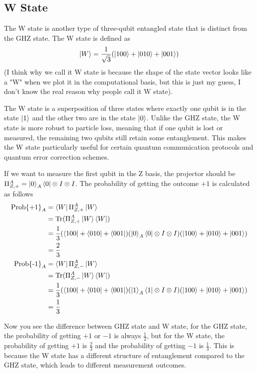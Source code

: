 \documentclass[11pt, letterpaper]{article}
\begin{document}
\subsection{W State}
The W state is another type of three-qubit entangled state that is distinct from the GHZ state. The W state is defined as
\begin{equation}
  \ket{W} = \frac{1}{\sqrt{3}}(\ket{100} + \ket{010} + \ket{001})
\end{equation}
(I think why we call it W state is because the shape of the state vector looks like a "W" when we plot it in the computational basis, but this is just my guess, I don't know the real reason why people call it W state).

The W state is a superposition of three states where exactly one qubit is in the state $\ket{1}$ and the other two are in the state $\ket{0}$. Unlike the GHZ state, the W state is more robust to particle loss, meaning that if one qubit is lost or measured, the remaining two qubits still retain some entanglement. This makes the W state particularly useful for certain quantum communication protocols and quantum error correction schemes.

If we want to measure the first qubit in the Z basis, the projector should be $\Pi_{Z, +}^{A} = \ket{0}_A\bra{0} \otimes I \otimes I$. The probability of getting the outcome $+1$ is calculated as follows
\begin{equation}
  \begin{aligned}
    \text{Prob\{+1\}}_A & = \bra{W} \Pi_{Z, +}^{A} \ket{W} \\
    & = \text{Tr}(\Pi_{Z, +}^{A} \ket{W}\bra{W}) \\
    & = \frac{1}{3}(\bra{100} + \bra{010} + \bra{001})(\ket{0}_A\bra{0} \otimes I \otimes I)(\ket{100} + \ket{010} + \ket{001}) \\
    & = \frac{2}{3} \\
    \text{Prob\{-1\}}_A & = \bra{W} \Pi_{Z, -}^{A} \ket{W} \\
    & = \text{Tr}(\Pi_{Z, -}^{A} \ket{W}\bra{W}) \\
    & = \frac{1}{3}(\bra{100} + \bra{010} + \bra{001})(\ket{1}_A\bra{1} \otimes I \otimes I)(\ket{100} + \ket{010} + \ket{001}) \\
    & = \frac{1}{3}
  \end{aligned}
\end{equation}

Now you see the difference between GHZ state and W state, for the GHZ state, the probability of getting $+1$ or $-1$ is always $\frac{1}{2}$, but for the W state, the probability of getting $+1$ is $\frac{2}{3}$ and the probability of getting $-1$ is $\frac{1}{3}$. This is because the W state has a different structure of entanglement compared to the GHZ state, which leads to different measurement outcomes.
\end{document}
